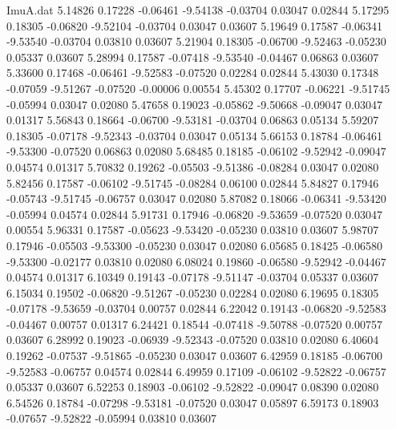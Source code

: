\begin{filecontents}{ImuA.dat}
   5.14826    0.17228   -0.06461   -9.54138   -0.03704    0.03047    0.02844
   5.17295    0.18305   -0.06820   -9.52104   -0.03704    0.03047    0.03607
   5.19649    0.17587   -0.06341   -9.53540   -0.03704    0.03810    0.03607
   5.21904    0.18305   -0.06700   -9.52463   -0.05230    0.05337    0.03607
   5.28994    0.17587   -0.07418   -9.53540   -0.04467    0.06863    0.03607
   5.33600    0.17468   -0.06461   -9.52583   -0.07520    0.02284    0.02844
   5.43030    0.17348   -0.07059   -9.51267   -0.07520   -0.00006    0.00554
   5.45302    0.17707   -0.06221   -9.51745   -0.05994    0.03047    0.02080
   5.47658    0.19023   -0.05862   -9.50668   -0.09047    0.03047    0.01317
   5.56843    0.18664   -0.06700   -9.53181   -0.03704    0.06863    0.05134
   5.59207    0.18305   -0.07178   -9.52343   -0.03704    0.03047    0.05134
   5.66153    0.18784   -0.06461   -9.53300   -0.07520    0.06863    0.02080
   5.68485    0.18185   -0.06102   -9.52942   -0.09047    0.04574    0.01317
   5.70832    0.19262   -0.05503   -9.51386   -0.08284    0.03047    0.02080
   5.82456    0.17587   -0.06102   -9.51745   -0.08284    0.06100    0.02844
   5.84827    0.17946   -0.05743   -9.51745   -0.06757    0.03047    0.02080
   5.87082    0.18066   -0.06341   -9.53420   -0.05994    0.04574    0.02844
   5.91731    0.17946   -0.06820   -9.53659   -0.07520    0.03047    0.00554
   5.96331    0.17587   -0.05623   -9.53420   -0.05230    0.03810    0.03607
   5.98707    0.17946   -0.05503   -9.53300   -0.05230    0.03047    0.02080
   6.05685    0.18425   -0.06580   -9.53300   -0.02177    0.03810    0.02080
   6.08024    0.19860   -0.06580   -9.52942   -0.04467    0.04574    0.01317
   6.10349    0.19143   -0.07178   -9.51147   -0.03704    0.05337    0.03607
   6.15034    0.19502   -0.06820   -9.51267   -0.05230    0.02284    0.02080
   6.19695    0.18305   -0.07178   -9.53659   -0.03704    0.00757    0.02844
   6.22042    0.19143   -0.06820   -9.52583   -0.04467    0.00757    0.01317
   6.24421    0.18544   -0.07418   -9.50788   -0.07520    0.00757    0.03607
   6.28992    0.19023   -0.06939   -9.52343   -0.07520    0.03810    0.02080
   6.40604    0.19262   -0.07537   -9.51865   -0.05230    0.03047    0.03607
   6.42959    0.18185   -0.06700   -9.52583   -0.06757    0.04574    0.02844
   6.49959    0.17109   -0.06102   -9.52822   -0.06757    0.05337    0.03607
   6.52253    0.18903   -0.06102   -9.52822   -0.09047    0.08390    0.02080
   6.54526    0.18784   -0.07298   -9.53181   -0.07520    0.03047    0.05897
   6.59173    0.18903   -0.07657   -9.52822   -0.05994    0.03810    0.03607

\end{filecontents}
